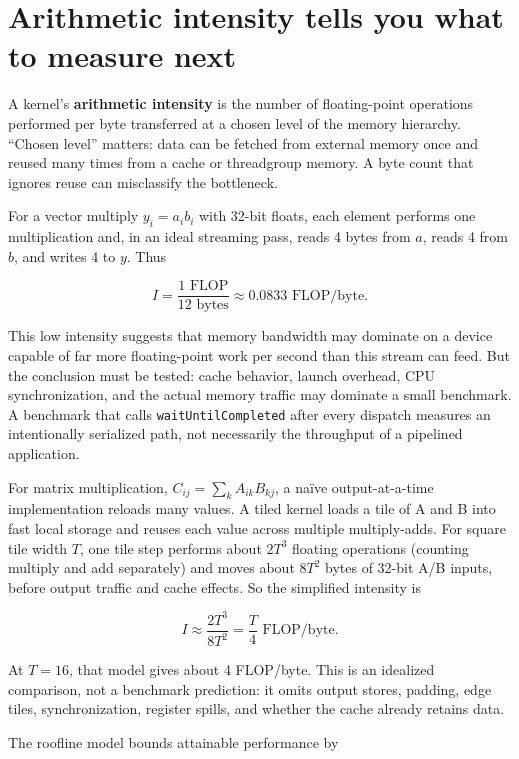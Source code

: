 \section{Arithmetic intensity tells you what to measure next}\label{05-engine-i-ch019-arithmetic-intensity-tells-you-what-to-measure-next}

A kernel's \textbf{arithmetic intensity} is the number of floating-point operations performed per byte transferred at a chosen level of the memory hierarchy. ``Chosen level'' matters: data can be fetched from external memory once and reused many times from a cache or threadgroup memory. A byte count that ignores reuse can misclassify the bottleneck.

For a vector multiply \(y_i=a_i b_i\) with 32-bit floats, each element performs one multiplication and, in an ideal streaming pass, reads 4 bytes from \(a\), reads 4 from \(b\), and writes 4 to \(y\). Thus

\[
I=\frac{1\text{ FLOP}}{12\text{ bytes}}\approx0.0833\text{ FLOP/byte}.
\]

This low intensity suggests that memory bandwidth may dominate on a device capable of far more floating-point work per second than this stream can feed. But the conclusion must be tested: cache behavior, launch overhead, CPU synchronization, and the actual memory traffic may dominate a small benchmark. A benchmark that calls \texttt{waitUntilCompleted} after every dispatch measures an intentionally serialized path, not necessarily the throughput of a pipelined application.

For matrix multiplication, \(C_{ij}=\sum_k A_{ik}B_{kj}\), a naïve output-at-a-time implementation reloads many values. A tiled kernel loads a tile of A and B into fast local storage and reuses each value across multiple multiply-adds. For square tile width \(T\), one tile step performs about \(2T^3\) floating operations (counting multiply and add separately) and moves about \(8T^2\) bytes of 32-bit A/B inputs, before output traffic and cache effects. So the simplified intensity is

\[
I\approx\frac{2T^3}{8T^2}=\frac{T}{4}\text{ FLOP/byte}.
\]

At \(T=16\), that model gives about 4 FLOP/byte. This is an idealized comparison, not a benchmark prediction: it omits output stores, padding, edge tiles, synchronization, register spills, and whether the cache already retains data.

The roofline model bounds attainable performance by

